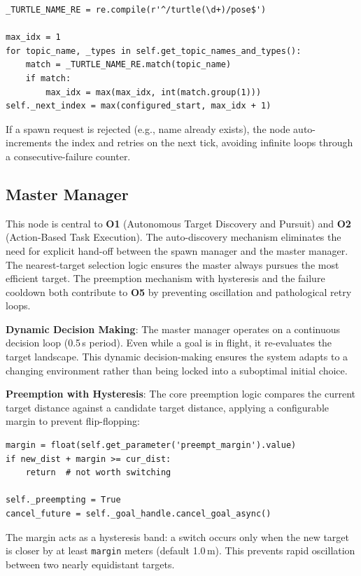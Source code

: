 \documentclass{article}
\begin{document}
\begin{homeworkProblem}[3]
\begin{verbatim}
_TURTLE_NAME_RE = re.compile(r'^/turtle(\d+)/pose$')

max_idx = 1
for topic_name, _types in self.get_topic_names_and_types():
    match = _TURTLE_NAME_RE.match(topic_name)
    if match:
        max_idx = max(max_idx, int(match.group(1)))
self._next_index = max(configured_start, max_idx + 1)
\end{verbatim}

If a spawn request is rejected (e.g., name already exists), the node auto-increments the index and retries on the next tick, avoiding infinite loops through a consecutive-failure counter.

\subsection{Master Manager}

This node is central to \textbf{O1} (Autonomous Target Discovery and Pursuit) and \textbf{O2} (Action-Based Task Execution). The auto-discovery mechanism eliminates the need for explicit hand-off between the spawn manager and the master manager. The nearest-target selection logic ensures the master always pursues the most efficient target. The preemption mechanism with hysteresis and the failure cooldown both contribute to \textbf{O5} by preventing oscillation and pathological retry loops.

\textbf{Dynamic Decision Making}: The master manager operates on a continuous decision loop (0.5\,s period). Even while a goal is in flight, it re-evaluates the target landscape. This dynamic decision-making ensures the system adapts to a changing environment rather than being locked into a suboptimal initial choice.

\textbf{Preemption with Hysteresis}: The core preemption logic compares the current target distance against a candidate target distance, applying a configurable margin to prevent flip-flopping:

\begin{verbatim}
margin = float(self.get_parameter('preempt_margin').value)
if new_dist + margin >= cur_dist:
    return  # not worth switching

self._preempting = True
cancel_future = self._goal_handle.cancel_goal_async()
\end{verbatim}

The margin acts as a hysteresis band: a switch occurs only when the new target is closer by at least \texttt{margin} meters (default 1.0\,m). This prevents rapid oscillation between two nearly equidistant targets.


\end{homeworkProblem}
\end{document}
